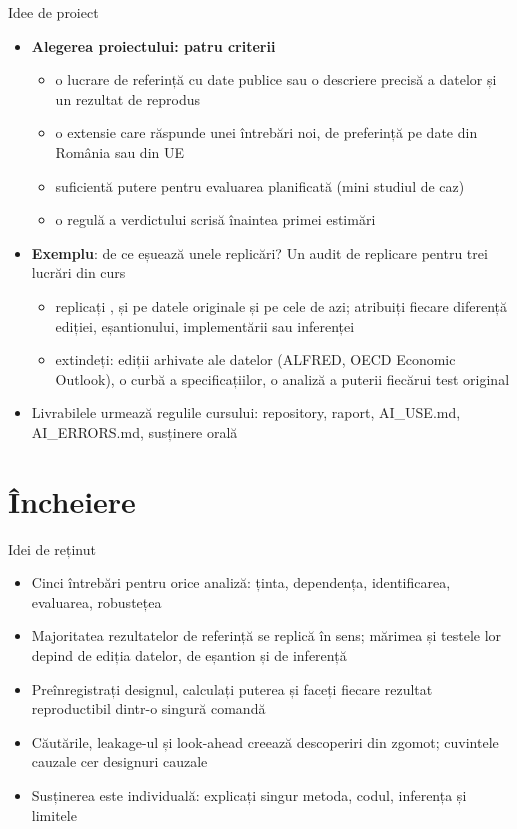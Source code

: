 \begin{frame}{Idee de proiect}
\itemsize{\small}
\begin{itemize}
    \item \textbf{Alegerea proiectului: patru criterii}
    \begin{itemize}
        \item o lucrare de referință cu date publice sau o descriere precisă a datelor și un rezultat de reprodus
        \item o extensie care răspunde unei întrebări noi, de preferință pe date din România sau din UE
        \item suficientă putere pentru evaluarea planificată (mini studiul de caz)
        \item o regulă a verdictului scrisă înaintea primei estimări
    \end{itemize}
    \item \textbf{Exemplu}: de ce eșuează unele replicări? Un audit de replicare pentru trei lucrări din curs
    \begin{itemize}
        \item replicați ,  și  pe datele originale și pe cele de azi; atribuiți fiecare diferență ediției, eșantionului, implementării sau inferenței
        \item extindeți: ediții arhivate ale datelor (ALFRED, OECD Economic Outlook), o curbă a specificațiilor, o analiză a puterii fiecărui test original
    \end{itemize}
    \item Livrabilele urmează regulile cursului: repository, raport, AI\_USE.md, AI\_ERRORS.md, susținere orală
\end{itemize}
\end{frame}


\section{Încheiere}

\begin{frame}{Idei de reținut}
\itemsize{\small}
\begin{itemize}
    \item Cinci întrebări pentru orice analiză: ținta, dependența, identificarea, evaluarea, robustețea
    \item Majoritatea rezultatelor de referință se replică în sens; mărimea și testele lor depind de ediția datelor, de eșantion și de inferență
    \item Preînregistrați designul, calculați puterea și faceți fiecare rezultat reproductibil dintr-o singură comandă
    \item Căutările, leakage-ul și look-ahead creează descoperiri din zgomot; cuvintele cauzale cer designuri cauzale
    \item Susținerea este individuală: explicați singur metoda, codul, inferența și limitele
\end{itemize}
\end{frame}

